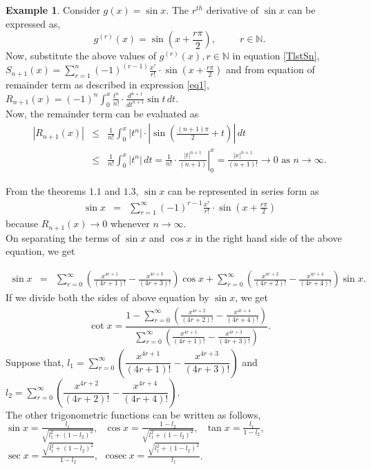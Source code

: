 \documentclass{amsart}
\theoremstyle{definition}
\newtheorem{example}[theorem]{Example}
\theoremstyle{remark}
\numberwithin{equation}{section}
\begin{document}
\begin{example}
Consider $g(x)=\sin x$. The $r^{th}$ derivative of $\sin x$ can be expressed as,
\begin{equation*}
  g^{(r)}(x)=\sin \left( x + \frac{r\pi}{2} \right) ,~~~~~~~~~~~ r\in \mathbb{N}.
\end{equation*}
Now, substitute the above values of $g^{(r)}(x), r\in \mathbb{N} $ in equation \eqref{TlstSn},\\
 $\displaystyle{ S_{n+1}(x)=\sum_{r=1}^n (-1)^{(r-1)} \frac{x^r}{r!} \cdot \sin \left(x+\frac{r\pi}{2} \right)}$
 and from equation of remainder term as described in expression \eqref{eq1},
 $\displaystyle{ R_{n+1}(x)=(-1)^n \int_0^x \frac{t^n}{n!} \cdot \frac{d^{n+1}}{dt^{n+1}} \sin t \, dt}.$\\
Now, the remainder term can be evaluated as
\begin{eqnarray*}
|R_{n+1}(x)| &\leq& \frac{1}{n!} \int_0^x \left|t^n\right| \cdot \left| \sin \left( \frac{(n+1)\pi}{2}+t \right) \right| \, dt\\
&\leq& \frac{1}{n!} \int_0^x \left|t^n\right| \, dt = \left. \frac{1}{n!} \cdot \frac{|t|^{n+1}}{(n+1)} \right|_0^x = \frac{|x|^{n+1}}{(n+1)!}\to 0 \textrm { as } n\to \infty.
\end{eqnarray*}

\noindent From the theorems $1.1$ and $1.3$, $\sin x$ can be represented in series form as
\begin{eqnarray*}
\sin x &=& \sum_{r=1}^{\infty} (-1)^{r-1} \frac{x^r}{r!} \cdot \sin \left(x+\frac{r \pi}{2}\right)
\end{eqnarray*}
because $R_{n+1}(x) \rightarrow 0$ whenever $n \rightarrow \infty$.\\
On separating the terms of $\sin x$ and $\cos x$ in the right hand side of the above equation, we get

\begin{eqnarray*}
\sin x &=& \sum_{r=0}^\infty \left(\frac{x^{4r+1}}{(4r+1)!}-\frac{x^{4r+3}}{(4r+3)!}\right)\cos x + \sum_{r=0}^\infty \left(\frac{x^{4r+2}}{(4r+2)!}-\frac{x^{4r+4}}{(4r+4)!}\right)\sin x.
\end{eqnarray*}
If we divide both the sides of above equation by $\sin x$, we get
\begin{eqnarray*}
\cot x = \dfrac{1- \displaystyle\sum_{r=0}^{\infty} \left(\frac{x^{4r+2}}{(4r+2)!}-\frac{x^{4r+4}}{(4r+4)!}\right)}{\displaystyle\sum_{r=0}^\infty \left(\frac{x^{4r+1}}{(4r+1)!}-\frac{x^{4r+3}}{(4r+3)!}\right)}.
\end{eqnarray*}
Suppose that, $\displaystyle{ l_1=\sum_{r=0}^{\infty} \left( \dfrac{x^{4r+1}}{(4r+1)!} - \dfrac{x^{4r+3}}{(4r+3)!} \right)}$ and $\displaystyle{ l_2=\sum_{r=0}^{\infty} \left( \dfrac{x^{4r+2}}{(4r+2)!} - \dfrac{x^{4r+4}}{(4r+4)!} \right)}$. \\
The other trigonometric functions can be written as follows,\\
$\displaystyle{ \sin x = \frac{l_1}{\sqrt{l_1^2+(1-l_2)^2}},~~~ \cos x = \frac{1-l_2}{\sqrt{l_1^2+(1-l_2)^2}},~~~ \tan x =\frac{l_1}{1-l_2},} $\\
$\displaystyle{ \sec x = \frac{\sqrt{l_1^2+(1-l_2)^2}}{1-l_2},~~~ \mathrm{cosec}~ x = \frac{\sqrt{l_1^2+(1-l_2)^2}}{l_1}}$.
\end{example}
\end{document}
